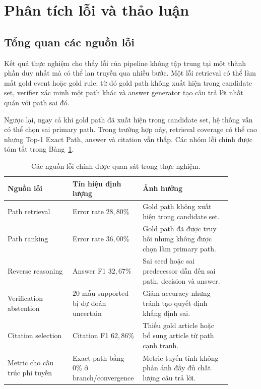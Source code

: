 \section{Phân tích lỗi và thảo luận}
\label{sec:discussion}

\subsection{Tổng quan các nguồn lỗi}

Kết quả thực nghiệm cho thấy lỗi của pipeline không tập trung tại một thành
phần duy nhất mà có thể lan truyền qua nhiều bước. Một lỗi retrieval có thể
làm mất gold event hoặc gold rule; từ đó gold path không xuất hiện trong
candidate set, verifier xác minh một path khác và answer generator tạo câu
trả lời nhất quán với path sai đó.

Ngược lại, ngay cả khi gold path đã xuất hiện trong candidate set, hệ thống
vẫn có thể chọn sai primary path. Trong trường hợp này, retrieval coverage
có thể cao nhưng Top-1 Exact Path, answer và citation vẫn thấp. Các nhóm lỗi
chính được tóm tắt trong Bảng~\ref{tab:error-summary}.

\begin{table}[t]
    \centering
    \caption{Các nguồn lỗi chính được quan sát trong thực nghiệm.}
    \label{tab:error-summary}
    \begin{tabular}{p{0.28\linewidth}p{0.22\linewidth}p{0.38\linewidth}}
        \hline
        \textbf{Nguồn lỗi} & \textbf{Tín hiệu định lượng} &
        \textbf{Ảnh hưởng} \\
        \hline
        Path retrieval &
        Error rate \(28{,}80\%\) &
        Gold path không xuất hiện trong candidate set. \\

        Path ranking &
        Error rate \(36{,}00\%\) &
        Gold path đã được truy hồi nhưng không được chọn làm primary path. \\

        Reverse reasoning &
        Answer F1 \(32{,}67\%\) &
        Sai seed hoặc sai predecessor dẫn đến sai path, decision và answer. \\

        Verification abstention &
        \(20\) mẫu supported bị dự đoán uncertain &
        Giảm accuracy nhưng tránh tạo quyết định khẳng định sai. \\

        Citation selection &
        Citation F1 \(62{,}86\%\) &
        Thiếu gold article hoặc bổ sung article từ path cạnh tranh. \\

        Metric cho cấu trúc phi tuyến &
        Exact path bằng \(0\%\) ở branch/convergence &
        Metric tuyến tính không phản ánh đầy đủ chất lượng câu trả lời. \\
        \hline
    \end{tabular}
\end{table}

